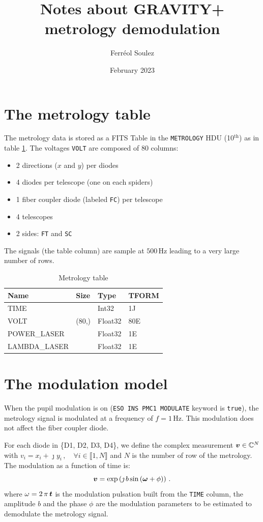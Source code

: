 \documentclass[a4paper,11pt,twoside]{scrartcl}
\title{Notes about GRAVITY+ metrology demodulation}
\author{Ferréol Soulez }
\date{February 2023}
\begin{document}
\maketitle

\section{The metrology table}
The metrology data is stored as a FITS Table in the \verb+METROLOGY+ HDU (10$^\textrm{th}$) as in table \ref{tab:table}. The voltages \verb+VOLT+ are composed of $80$ columns:
\begin{itemize}
    \item 2 directions ($x$ and  $y$) per diodes
    \item 4 diodes per telescope (one on each spiders)
    \item 1 fiber coupler diode (labeled \verb+FC+) per telescope
    \item 4 telescopes
    \item 2 sides: \verb|FT|  and \verb|SC|
\end{itemize}
The signals (the table column) are sample at $500\,$Hz leading to a very large number of rows. 
\begin{table}[]
    \centering
    \begin{tabular}{l| l ll}
Name   &       Size  & Type  &   TFORM   \\
\hline
TIME   &              & Int32  &  1J     \\
VOLT   &       (80,) & Float32 &  80E    \\
POWER\_LASER   &    &   Float32 & 1E     \\
LAMBDA\_LASER   &    &  Float32 & 1E     
    \end{tabular}
    \caption{Metrology table}
    \label{tab:table}
\end{table}

\section{The modulation model}

When the pupil modulation is on (\verb|ESO INS PMC1 MODULATE| keyword is \verb|true|), the metrology signal is modulated at a frequency of $f=1\,$Hz. 
This modulation does not affect the fiber coupler diode.

For each diode in \{D1, D2, D3, D4\}, we define the complex measurement $\boldsymbol{v} \in \mathbb{C}^N$  with $v_i =   x_i + \jmath y_i \,, \quad \forall i \in \llbracket 1,N \rrbracket $ and  $N$ is the number of row of the metrology. The modulation as a function of time is:
\begin{equation}
    \boldsymbol{v} = \exp\left( \jmath \, b \sin\left( \boldsymbol{\omega} + \phi\right)\right)\,.\label{eq:v}
\end{equation}
where $\omega = 2\,\pi\,\boldsymbol{t}$ is the modulation pulsation built from the \verb|TIME| column, the amplitude $b$  and the phase $\phi$  are the modulation parameters to be estimated to demodulate the metrology signal.
\end{document}
